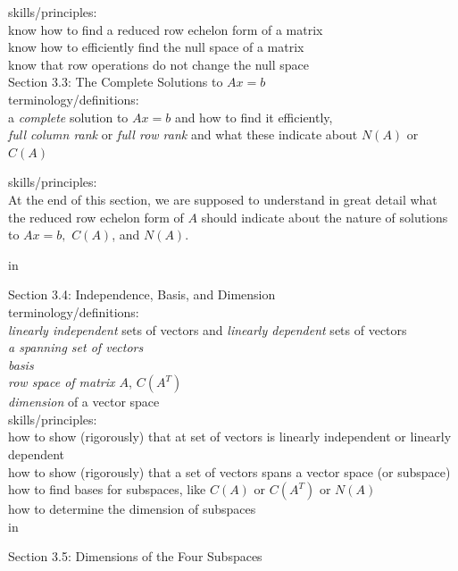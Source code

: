 \documentclass[11pt,fleqn]{article}
\begin{document}
skills/principles: \\
know how to find a reduced row echelon form of a matrix\\
know how to efficiently find the null space of a matrix\\
know that row operations do not change the null space\\

\noindent Section 3.3: The Complete Solutions to $Ax=b$ \\

terminology/definitions: \\
a \emph{complete} solution to $Ax=b$ and how to find it efficiently,\\
\emph{full column rank} or \emph{full row rank} and what these indicate about $N(A)$ or $C(A)$

skills/principles: \\
At the end of this section, we are supposed to understand in great detail what the reduced row echelon form of $A$ should indicate about the nature of solutions to $Ax=b,$ $C(A)$, and $N(A).$

 in

\noindent Section 3.4: Independence, Basis, and Dimension \\

terminology/definitions: \\
\emph{linearly independent} sets of vectors and \emph{linearly dependent} sets of vectors\\
\emph{a spanning set of vectors}\\
\emph{basis}\\
\emph{row space of matrix $A$}, $C(A^T)$\\
\emph{dimension} of a vector space\\

skills/principles: \\
how to show (rigorously) that at set of vectors is linearly independent or linearly dependent\\
how to show (rigorously) that a set of vectors spans a vector space (or subspace)\\
how to find bases for subspaces, like $C(A)$ or $C(A^T)$ or $N(A)$\\
how to determine the dimension of subspaces\\

 in

\noindent Section 3.5: Dimensions of the Four Subspaces\\
\end{document}
